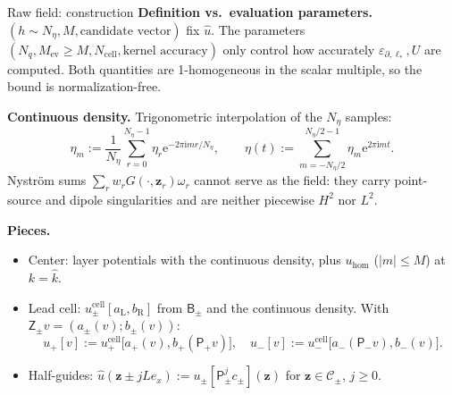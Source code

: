 \documentclass[aspectratio=169]{beamer}
\newcommand{\ii}{\mathrm{i}}
\newcommand{\ee}{\mathrm{e}}
\newcommand{\eps}{\varepsilon_{\partial,\ell_*}}
\begin{document}
\begin{frame}{Raw field: construction}
  \footnotesize
  \textbf{Definition vs.\ evaluation parameters.} $(h\sim N_\eta, M, \text{candidate vector})$
  fix $\widehat u$. The parameters $(N_q, M_{\mathrm{ev}}\ge M, N_{\mathrm{cell}},
  \text{kernel accuracy})$ only control how accurately $\eps,U$ are computed.
  Both quantities are 1-homogeneous in the scalar multiple, so the bound is
  normalization-free.

  \medskip
  \textbf{Continuous density.} Trigonometric interpolation of the $N_\eta$ samples:
  \[
    \eta_m:=\frac1{N_\eta}\sum_{r=0}^{N_\eta-1}\eta_r\ee^{-2\pi\ii mr/N_\eta},\qquad
    \eta(t):=\sum_{m=-N_\eta/2}^{N_\eta/2-1}\eta_m\ee^{2\pi\ii mt}.
  \]
  Nystr\"om sums $\sum_rw_rG(\cdot,\mathbf z_r)\omega_r$ cannot serve as the field: they
  carry point-source and dipole singularities and are neither piecewise $H^2$ nor $L^2$.

  \medskip
  \textbf{Pieces.}
  \begin{itemize}
    \item Center: layer potentials with the continuous density, plus $u_{\mathrm{hom}}$
      ($|m|\le M$) at $k=\widehat k$.
    \item Lead cell: $u^{\mathrm{cell}}_\pm[a_{\mathrm L},b_{\mathrm R}]$ from
      $\mathsf B_\pm$ and the continuous density. With $\mathsf Z_\pm v=(a_\pm(v);b_\pm(v))$:
      \[
        u_+[v]:=u_+^{\mathrm{cell}}\bigl[a_+(v),b_+(\mathsf P_+v)\bigr],\quad
        u_-[v]:=u_-^{\mathrm{cell}}\bigl[a_-(\mathsf P_-v),b_-(v)\bigr].
      \]
    \item Half-guides: $\widehat u(\mathbf z\pm jLe_x):=u_\pm[\mathsf P_\pm^jc_\pm](\mathbf z)$
      for $\mathbf z\in\mathcal C_\pm$, $j\ge0$.
  \end{itemize}
\end{frame}
\end{document}
